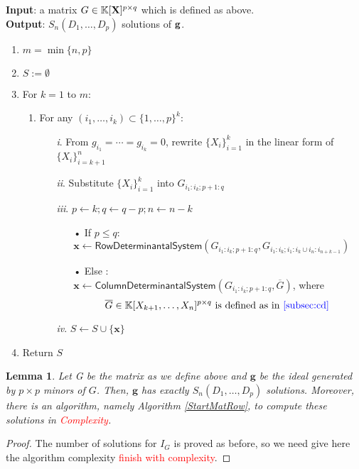 \documentclass[11pt]{article}
\numberwithin{Property}{section}
\numberwithin{Theorem}{section}
\numberwithin{Proposition}{section}
\newtheorem{Lemma}{Lemma}%
\numberwithin{Lemma}{section}
\numberwithin{Corollary}{section}
\numberwithin{Definition}{section}
\numberwithin{Remark}{section}
\numberwithin{Conjecture}{section}
\numberwithin{Problem}{section}
\numberwithin{Claim}{section}
\theoremstyle{definition}
\numberwithin{Example}{section}
\def\g {\ensuremath{\mathbf{g}}}
\renewcommand{\leq}{\leqslant}
\def\bar{\overline}
\newcommand{\field}{\mathbb{K}} %
\newcommand{\mat}[1]{\mathbf{\MakeUppercase{#1}}} %
\newcommand{\todo}[1]{\textcolor{red}{#1}} %
\newcommand{\improve}[1]{\textcolor{blue}{#1}} %
\begin{document}
\begin{algorithm}[]
\caption{$\mathsf{Start Matrix Row Degrees}$}
\label{StartMatRow}
{\bf Input}: a matrix $G \in \field[\mat{X}]^{p \times q}$ which is defined as above.\\
{\bf Output}: $S_{n}(D_1, \ldots, D_p)$ solutions of ${\bf g}$.
\begin{enumerate}
\item $m = \min \{n,p\}$
\item $S := \emptyset$
\item For $k = 1$ to $m$: 
\begin{enumerate}
\item For any  $(i_1, \ldots, i_k) \subset \{1, \ldots, p\}^k$:
\begin{itemize}
\item[\emph{i}.] From $g_{i_1} = \cdots = g_{i_k} = 0$, rewrite $\{X_i\}_{i = 1}^k$ in the linear form of $\{X_{i}\}_{i=k+1}^n$
\item[\emph{ii}.] Substitute $\{X_i\}_{i = 1}^k$ into $G_{i_1:i_k\mathbf{;}p+1:q}$
\item[\emph{iii}.] $p \gets k; q \gets q-p; n \gets n - k$
\begin{itemize}
\item[•] If $p \leq q$:\\ \hspace{1cm} $\mathbf{x} \gets \mathsf{RowDeterminantal System}(G_{i_1:i_k\mathbf{;}p+1:q}, G_{i_1:i_k;i_1:i_k \cup i_{n}:i_{n+k-1}})$
\item[•] Else :\\ \quad $\mathbf{x} \gets \mathsf{ColumnDeterminantal System}(G_{i_1:i_k\mathbf{;}p+1:q},\bar{G})$, where 
\[\bar{G} \in \field[X_{k+1}, \ldots, X_n]^{p \times q} \ \mathrm{is \ defined \ as \ in \ \improve{\cref{subsec:cd}}} \ \] 
\end{itemize}
\item[\emph{iv}.] $S \gets S \cup \{\mathbf{x}\}$
\end{itemize}
\end{enumerate}
\item Return $S$
\end{enumerate} 
\end{algorithm}
\begin{Lemma}\label{P3} Let G be the matrix as we define above and $\g$ be the ideal generated by $p \times p$ minors of $G$. Then, $\g$ has exactly $S_{n}(D_1, \ldots, D_p)$ solutions. Moreover, there is an algorithm, namely Algorithm \ref{StartMatRow}, to compute these solutions in \todo{Complexity}. 
\end{Lemma}
\begin{proof}
The number of solutions for $I_G$ is proved as before, so we need give here the algorithm complexity \todo{finish with complexity}.  
\end{proof}
\end{document}
